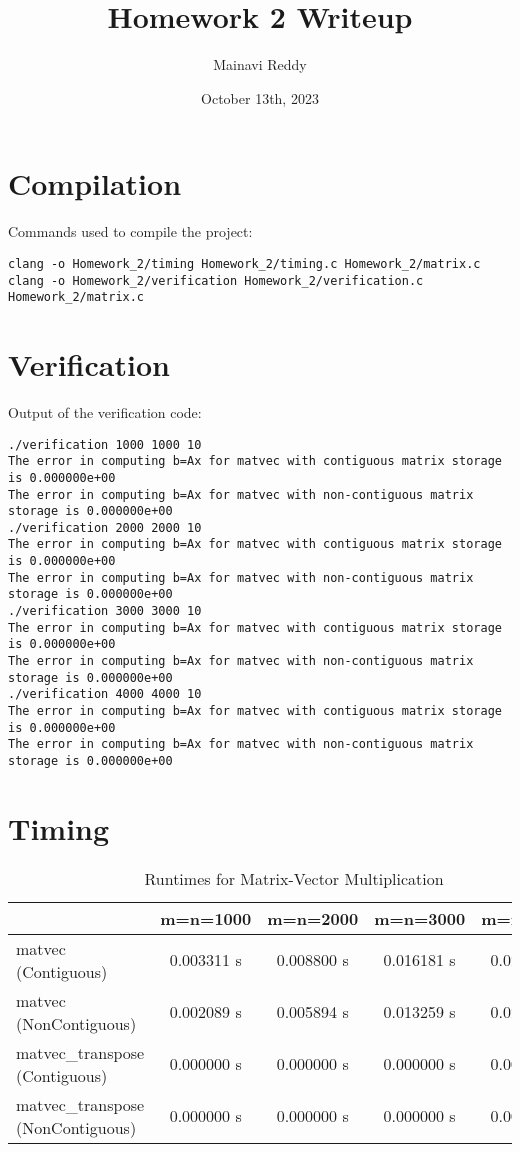 \documentclass{article}
\title{Homework 2 Writeup}
\author{Mainavi Reddy}
\date{October 13th, 2023}
\begin{document}
\maketitle

\section{Compilation}
Commands used to compile the project:
\begin{verbatim}
clang -o Homework_2/timing Homework_2/timing.c Homework_2/matrix.c
clang -o Homework_2/verification Homework_2/verification.c Homework_2/matrix.c
\end{verbatim}

\section{Verification}
Output of the verification code:
\begin{verbatim}
./verification 1000 1000 10
The error in computing b=Ax for matvec with contiguous matrix storage is 0.000000e+00
The error in computing b=Ax for matvec with non-contiguous matrix storage is 0.000000e+00
./verification 2000 2000 10
The error in computing b=Ax for matvec with contiguous matrix storage is 0.000000e+00
The error in computing b=Ax for matvec with non-contiguous matrix storage is 0.000000e+00
./verification 3000 3000 10
The error in computing b=Ax for matvec with contiguous matrix storage is 0.000000e+00
The error in computing b=Ax for matvec with non-contiguous matrix storage is 0.000000e+00
./verification 4000 4000 10
The error in computing b=Ax for matvec with contiguous matrix storage is 0.000000e+00
The error in computing b=Ax for matvec with non-contiguous matrix storage is 0.000000e+00
\end{verbatim}

\section{Timing}
\begin{table}[h!]
\centering
\begin{tabular}{l|c|c|c|c}
\hline
& m=n=1000 & m=n=2000 & m=n=3000 & m=n=4000 \\
\hline
matvec (Contiguous) & 0.003311 s & 0.008800 s & 0.016181 s & 0.026594 s \\
matvec (NonContiguous) & 0.002089 s & 0.005894 s & 0.013259 s & 0.024397 s \\
matvec\_transpose (Contiguous) & 0.000000 s & 0.000000 s & 0.000000 s & 0.000000 s \\
matvec\_transpose (NonContiguous) & 0.000000 s & 0.000000 s & 0.000000 s & 0.000000 s \\
\hline
\end{tabular}
\caption{Runtimes for Matrix-Vector Multiplication}
\label{tab:timing}
\end{table}
\end{document}
